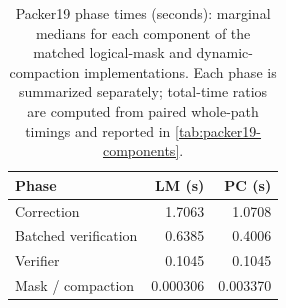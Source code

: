 \begin{table}[t]
\centering
\caption{Packer19 phase times (seconds): marginal medians for each component of the matched logical-mask and dynamic-compaction implementations. Each phase is summarized separately; total-time ratios are computed from paired whole-path timings and reported in \cref{tab:packer19-components}.}
\label{tab:phase-costs}
\small
\begin{tabular}{@{}lrr@{}}
\toprule
Phase & LM (s) & PC (s) \\
\midrule
Correction & 1.7063 & 1.0708 \\
Batched verification & 0.6385 & 0.4006 \\
Verifier & 0.1045 & 0.1045 \\
Mask / compaction & 0.000306 & 0.003370 \\
\bottomrule
\end{tabular}
\end{table}

